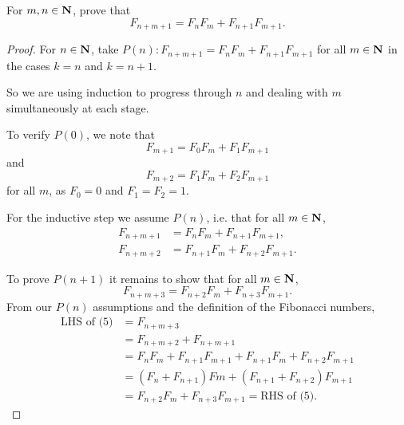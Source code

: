 \begin{prbm}
For $m,n\in\mathbf N$, prove that
\[ F_{n+m+1}=F_nF_m+F_{n+1}F_{m+1}. \]
\end{prbm}

\begin{proof}
For $n\in\mathbf N$, take $P(n):F_{n+m+1}=F_nF_m+F_{n+1}F_{m+1}$ for all $m\in\mathbf N$ in the cases $k=n$ and $k=n+1$.

So we are using induction to progress through $n$ and dealing with $m$ simultaneously at each stage. 

To verify $P(0)$, we note that
\[ F_{m+1}=F_0F_m+F_1F_{m+1} \]
and
\[ F_{m+2}=F_1F_m+F_2F_{m+1} \]
for all $m$, as $F_0=0$ and $F_1=F_2=1$.

For the inductive step we assume $P(n)$, i.e. that for all $m\in\mathbf N$,
\begin{align*}
F_{n+m+1}&=F_nF_m+F_{n+1}F_{m+1},\\
F_{n+m+2}&=F_{n+1}F_m+F_{n+2}F_{m+1}.
\end{align*}

To prove $P(n+1)$ it remains to show that for all $m\in\mathbf N$,
\[ F_{n+m+3}=F_{n+2}F_m+F_{n+3}F_{m+1}. \]
From our $P(n)$ assumptions and the definition of the Fibonacci numbers,
\begin{align*}
\text{LHS of (5)}&=F_{n+m+3}\\
&=F_{n+m+2}+F_{n+m+1}\\
&=F_n F_m+F_{n+1}F_{m+1}+F_{n+1}F_m+F_{n+2}F_{m+1}\\
&=(F_n+F_{n+1})Fm+(F_{n+1}+F_{n+2})F_{m+1}\\
&=F_{n+2}F_m+F_{n+3}F_{m+1}=\text{RHS of (5).}
\end{align*}
\end{proof}